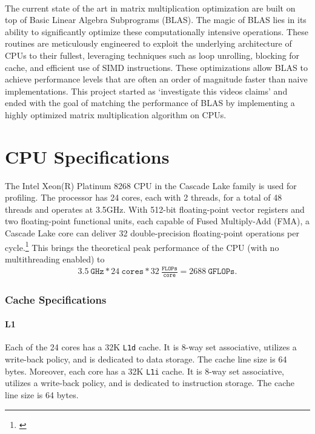 \documentclass{article}
\newcommand{\MYhref}[3][blue]{\href{#2}{\color{#1}{#3}}}%
\begin{document}
\

\noindent The current state of the art in matrix multiplication optimization are built 
on top of Basic Linear Algebra Subprograms (BLAS). The magic of BLAS lies in its ability 
to significantly optimize these computationally intensive operations. 
These routines are meticulously engineered to exploit the underlying architecture of CPUs to their fullest, 
leveraging techniques such as loop unrolling, blocking for cache, and efficient use of SIMD instructions. 
These optimizations allow BLAS to achieve performance levels that are often an order 
of magnitude faster than naive implementations. This project started as 
`investigate this videos claims' and ended with the goal of matching the performance 
of BLAS by implementing a highly optimized matrix multiplication algorithm on CPUs. 

\section{CPU Specifications}\label{SEC:CPU-SPECS}
The Intel Xeon(R) Platinum 8268 CPU in the Cascade Lake family is used for profiling. 
The processor has 24 cores, each with 2 threads, for a total of 48 threads and operates 
at 3.5GHz. With 512-bit floating-point vector registers and two floating-point 
functional units, each capable of Fused Multiply-Add (FMA), a Cascade Lake core can 
deliver 32 double-precision floating-point operations per cycle.\footnote{\MYhref{https://www.nas.nasa.gov/hecc/support/kb/cascade-lake-processors_579.html}{https://www.nas.nasa.gov/hecc/support/kb/cascade-lake-processors\_579.html}}
This brings the theoretical peak performance of the CPU (with no multithreading enabled) to 
\begin{align*}
    3.5\ \texttt{GHz} * 24\ \texttt{cores} * 32\ \frac{\texttt{FLOPs}}{\texttt{core}} = 2688\ \texttt{GFLOPs}.
\end{align*}

\subsubsection*{Cache Specifications}
\paragraph{L1}
Each of the 24 cores has a 32K \texttt{L1d} cache. It is 8-way set associative, utilizes a write-back policy, and is dedicated to data storage. The cache line size is 64 bytes.
Moreover, each core has a 32K \texttt{L1i} cache. It is 8-way set associative, utilizes a write-back policy, and is dedicated to instruction storage. The cache line size is 64 bytes.
\end{document}
